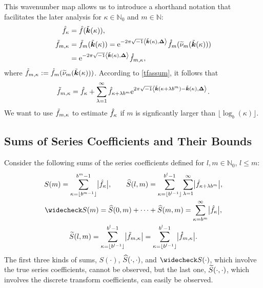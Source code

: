 \documentclass[graybox,footinfo]{svmult}
\newcommand{\N}{\mathbb{N}} %
\newcommand{\bsDelta}{\boldsymbol{\Delta}}    %
\begin{document}
This wavenumber map allows us to introduce a shorthand notation that facilitates the later analysis for $\kappa \in \N_0$ and $m \in \N$:
\begin{align*}
\hf_{\kappa} & =\hf(\tvk(\kappa)), \\
\tf_{m,\kappa}& = \tf_m(\tvk(\kappa))= \me^{-2 \pi \sqrt{-1} \ip{\tvk(\kappa)}{\bsDelta}} \rf_m(\tnu_m(\tvk(\kappa)))\\
&= \me^{-2 \pi \sqrt{-1} \ip{\tvk(\kappa)}{\bsDelta}} \rf_{m,\kappa},
\end{align*}
where $\mathring{f}_{m,\kappa}:=\mathring{f}_m(\widetilde{\nu}_m(\tilde{\boldsymbol{k}}(\kappa)))$. According to \eqref{tfassum}, it follows that
\begin{equation}
\tf_{m,\kappa} = \hf_{\kappa} + \sum_{\lambda=1}^{\infty} \hf_{\kappa+\lambda b^{m}} \me^{2 \pi \sqrt{-1} \ip{\tvk(\kappa+\lambda b^{m}) - \tvk(\kappa)}{\bsDelta}}.
\label{tfassumc}
\end{equation}
We want to use $\tilde{f}_{m,\kappa}$ to estimate $\hat{f}_{\kappa}$ if $m$ is signficantly larger than $\lfloor \log_b(\kappa) \rfloor$.

\subsection{Sums of Series Coefficients and Their Bounds}\label{sumscoeff}
Consider the following sums of the series coefficients defined for $l,m \in \N_0$, $l \le m$:
\begin{gather*}
S(m) =  \sum_{\kappa=\left \lfloor b^{m-1} \right \rfloor}^{b^{m}-1} \bigabs{\hf_{\kappa}}, \qquad
\hS(l,m)  = \sum_{\kappa=\left \lfloor b^{l-1} \right \rfloor}^{b^{l}-1} \sum_{\lambda=1}^{\infty} \bigabs{ \hf_{\kappa+\lambda b^{m}}}, \\
\wcS(m)=\hS(0,m) + \cdots + \hS(m,m)=
\sum_{\kappa=b^{m}}^{\infty} \bigabs{\hf_{\kappa}}, \\
\tS(l,m) = \sum_{\kappa=\left \lfloor b^{l-1}\right \rfloor}^{b^{l}-1} \bigabs{\tf_{m,\kappa}} = \sum_{\kappa=\left \lfloor b^{l-1}\right \rfloor}^{b^{l}-1} \bigabs{\rf_{m,\kappa}}.
\end{gather*}
The first three kinds of sums, $S(\cdot)$, $\widehat{S}(\cdot,\cdot)$, and $\wcS(\cdot)$, which involve the true series coefficients, cannot be observed, but the last one, $\widetilde{S}(\cdot, \cdot)$, which involves the discrete transform coefficients, can easily be observed.
\end{document}
